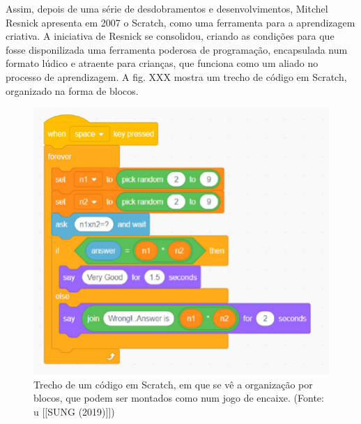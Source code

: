 \documentclass[
12pt,		%
openright,	%
twoside,  %
a4paper,			%
chapter=TITLE,		%
english,			%
french,				%
spanish,			%
brazil				%
]{USPSC-classe/USPSC}
\begin{document}
Assim, depois de uma s\'erie de desdobramentos e desenvolvimentos, Mitchel Resnick apresenta em 2007 o Scratch, como uma ferramenta para a aprendizagem criativa. A iniciativa de Resnick se consolidou, criando as condi\c{c}\~oes para que fosse disponilizada uma ferramenta poderosa de programa\c{c}\~ao, encapsulada num formato l\'udico e atraente para crian\c{c}as, que funciona como um aliado no processo de aprendizagem. A fig. XXX mostra um trecho de c\'odigo em Scratch, organizado na forma de blocos.












\captionsetup{format=plain}
\begin{figure}[max size={\textwidth}{\textheight}]

\centering


\begin{minipage}[b]{0.4\linewidth}
        \centering
                \includegraphics[width=1.0\linewidth]{../../imagens/Scratch-Block.png}
                \caption{Trecho de um c\'odigo em Scratch, em que se v\^e a organiza\c{c}\~ao por blocos, que podem ser montados como num jogo de encaixe. (Fonte: u [[SUNG (2019)]])}
                \label{5cac9c9edeb34a88b5571069bb494cda1ce1bd9c}
\end{minipage}%
\hspace{0.5cm}
\end{figure}
\end{document}

